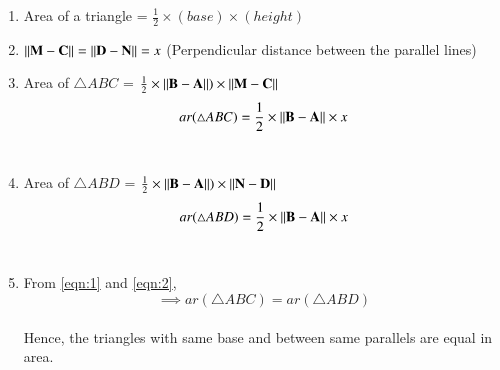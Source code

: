 \renewcommand{\theequation}{\theenumi}
\begin{enumerate}[label=\thesection.\arabic*.,ref=\thesection.\theenumi]
%
\item Area of a triangle = $\frac{1}{2}\times(base)\times(height)$
\\
\item $\left\lVert\mathbf{M}-\mathbf{C}\right\rVert = \left\lVert\mathbf{D}-\mathbf{N}\right\rVert = x$ (Perpendicular distance between the parallel lines)  
\\
\item Area of $\triangle{ABC}$ = $\frac{1}{2}\times\left\lVert\mathbf{B}-\mathbf{A}\right\rVert)\times\left\lVert\mathbf{M}-\mathbf{C}\right\rVert$ 
$$ ar(\triangle{ABC})=\frac{1}{2}\times\left\lVert\mathbf{B}-\mathbf{A}\right\rVert\times x$$ 
\label{eqn:1}
\\
\item Area of $\triangle{ABD}$ = $\frac{1}{2}\times\left\lVert\mathbf{B}-\mathbf{A}\right\rVert)\times\left\lVert\mathbf{N}-\mathbf{D}\right\rVert$  
$$ ar(\triangle{ABD})=\frac{1}{2}\times\left\lVert\mathbf{B}-\mathbf{A}\right\rVert\times x$$ 
\label{eqn:2}
\\
\item From \ref{eqn:1} and \ref{eqn:2},
$$\implies ar(\triangle{ABC}) = ar(\triangle{ABD})$$ \\

Hence, the triangles with same base and between same parallels are equal in area.

\end{enumerate}